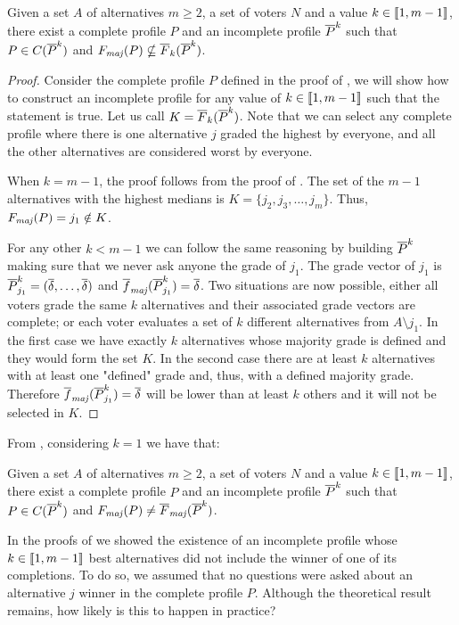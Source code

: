 	\begin{theorem}
		\label{th:uncompleteK}
		Given a set $A$ of alternatives $m\geq 2$, a set of voters $N$ and a value $k\in \llbracket1,m-1\rrbracket$, there exist a complete profile $P$ and an incomplete profile $\overline{P}^k$ such that $P \in C(\overline{P}^k)$ and $\Fmaj(P) \nsubseteq \overline{F}_k(\Pbar^k)$.
	\end{theorem}
	\begin{proof}
		Consider the complete profile $P$ defined in the proof of , we will show how to construct an incomplete profile for any value of $k\in \llbracket1,m-1\rrbracket$ such that the statement is true. Let us call $K=\overline{F}_k(\overline{P}^k)$.
		Note that we can select any complete profile where there is one alternative $j$ graded the highest by everyone, and all the other alternatives are considered worst by everyone.
		
		When $k=m-1$, the proof follows from the proof of . The set of the $m-1$ alternatives with the highest medians is $K=\{j_2,j_3,\dots,j_m\}$. Thus, $\Fmaj(P)=j_1 \notin K$.
		
		For any other $k<m-1$ we can follow the same reasoning by building $\overline{P}^k$ making sure that we never ask anyone the grade of $j_1$. 
		The grade vector of $j_1$ is $\overline{P}^k_{j_1}=(\overline{\delta}, \dots, \overline{\delta})$ and $\fmajbar(\Pbar^k_{j_1})=\dbar$.
		Two situations are now possible, either all voters grade the same $k$ alternatives and their associated grade vectors are complete; or each voter evaluates a set of $k$ different alternatives from $A\setminus j_1$. In the first case we have exactly $k$ alternatives whose majority grade is defined and they would form the set $K$. In the second case there are at least $k$ alternatives with at least one "defined" grade and, thus, with a defined majority grade.  Therefore $\fmajbar(\Pbar^k_{j_1})=\dbar$ will be lower than at least $k$ others and it will not be selected in $K$.
	\end{proof}	
	
	From , considering $k=1$ we have that:
	\begin{remark}
		Given a set $A$ of alternatives $m\geq 2$, a set of voters $N$ and a value $k\in \llbracket1,m-1\rrbracket$, there exist a complete profile $P$ and an incomplete profile $\overline{P}^k$ such that $P \in C(\overline{P}^k)$ and $\Fmaj(P) \neq \Fmajbar(\Pbar^k)$.
	\end{remark}

	In the proofs of  we showed the existence of an incomplete profile whose $k \in \llbracket1,m-1\rrbracket$ best alternatives did not include the winner of one of its completions. To do so, we assumed that no questions were asked about an alternative $j$ winner in the complete profile $P$. Although the theoretical result remains, how likely is this to happen in practice?
	
